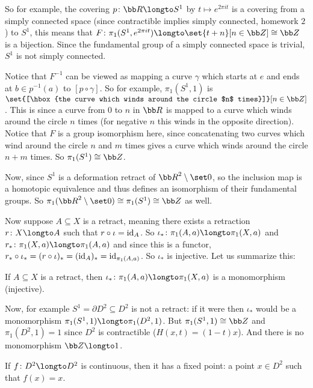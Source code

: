 So for example, the covering $p\colon{\bb R}\longto S^1$ by $t\mapsto e^{2\pi it}$ is a covering from a simply connected space (since contractible implies simply connected, homework $2$) to $S^1$, this
means that $F\colon\pi_1(S^1,e^{2\pi it})\longto\set{t+n}[n\in{\bb Z}]\cong{\bb Z}$ is a bijection.
Since the fundamental group of a simply connected space is trivial, $S^1$ is not simply connected.

Notice that $F^{-1}$ can be viewed as mapping a curve $\gamma$ which starts at $e$ and ends at $b\in p^{-1}(a)$ to $[p\circ\gamma]$.
So for example, $\pi_1(S^1,1)$ is $\set{[\hbox{the curve which winds around the circle $n$ times}]}[n\in{\bb Z}]$.
This is since a curve from $0$ to $n$ in ${\bb R}$ is mapped to a curve which winds around the circle $n$ times (for negative $n$ this winds in the opposite direction).
Notice that $F$ is a group isomorphism here, since concatenating two curves which wind around the circle $n$ and $m$ times gives a curve which winds around the circle $n+m$ times.
So $\pi_1(S^1)\cong{\bb Z}$.

Now, since $S^1$ is a deformation retract of ${\bb R}^2\setminus\set0$, so the inclusion map is a homotopic equivalence and thus defines an isomorphism of their fundamental groups.
So $\pi_1({\bb R}^2\setminus\set0)\cong\pi_1(S^1)\cong{\bb Z}$ as well.

Now suppose $A\subseteq X$ is a retract, meaning there exists a retraction $r\colon X\longto A$ such that $r\circ\iota={\rm id}_A$.
So $\iota_*\colon\pi_1(A,a)\longto\pi_1(X,a)$ and $r_*\colon\pi_1(X,a)\longto\pi_1(A,a)$ and since this is a functor, $r_*\circ\iota_*=(r\circ\iota)_*=({\rm id}_A)_*={\rm id}_{\pi_1(A,a)}$.
So $\iota_*$ is injective.
Let us summarize this:

\bprop

    If $A\subseteq X$ is a retract, then $\iota_*\colon\pi_1(A,a)\longto\pi_1(X,a)$ is a monomorphism (injective).

\eprop

Now, for example $S^1=\partial D^2\subseteq D^2$ is not a retract: if it were then $\iota_*$ would be a monomorphism $\pi_1(S^1,1)\longto\pi_1(D^2,1)$.
But $\pi_1(S^1,1)\cong{\bb Z}$ and $\pi_1(D^2,1)=1$ since $D^2$ is contractible ($H(x,t)=(1-t)x$).
And there is no monomorphism ${\bb Z}\longto1$.

\bthrm[title=Brouwer Fixed-Point Theorem (for $D^2$), name=fpthrm]

    If $f\colon D^2\longto D^2$ is continuous, then it has a fixed point: a point $x\in D^2$ such that $f(x)=x$.

